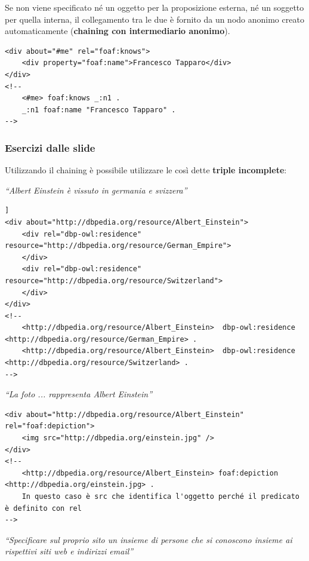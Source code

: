 Se non viene specificato né un oggetto per la proposizione esterna, né un soggetto per quella interna, il collegamento tra le due è fornito da un nodo anonimo creato automaticamente (\textbf{chaining con intermediario anonimo}).

\begin{lstlisting}[language=RDFA, caption=Utilizzo del chaining anonimo]
<div about="#me" rel="foaf:knows">
	<div property="foaf:name">Francesco Tapparo</div>
</div>
<!--
	<#me> foaf:knows _:n1 .
	_:n1 foaf:name "Francesco Tapparo" .
-->
\end{lstlisting}

\subsubsection{Esercizi dalle slide}

Utilizzando il chaining è possibile utilizzare le così dette \textbf{triple incomplete}:

\begin{center}
\textit{``Albert Einstein è vissuto in germania e svizzera''}
\end{center}

\begin{lstlisting}[language=RDFA]]
<div about="http://dbpedia.org/resource/Albert_Einstein">	
	<div rel="dbp-owl:residence" resource="http://dbpedia.org/resource/German_Empire">
	</div>
	<div rel="dbp-owl:residence" resource="http://dbpedia.org/resource/Switzerland">
	</div>
</div>
<!--
	<http://dbpedia.org/resource/Albert_Einstein>  dbp-owl:residence <http://dbpedia.org/resource/German_Empire> .
	<http://dbpedia.org/resource/Albert_Einstein>  dbp-owl:residence <http://dbpedia.org/resource/Switzerland> .
-->
\end{lstlisting}

\begin{center}
	\textit{``La foto ... rappresenta Albert Einstein''}
\end{center}

\begin{lstlisting}[language=RDFA]
<div about="http://dbpedia.org/resource/Albert_Einstein" rel="foaf:depiction">
	<img src="http://dbpedia.org/einstein.jpg" />
</div>
<!-- 
	<http://dbpedia.org/resource/Albert_Einstein> foaf:depiction <http://dbpedia.org/einstein.jpg> .
	In questo caso è src che identifica l'oggetto perché il predicato è definito con rel
-->
\end{lstlisting}

\begin{center}
	\textit{``Specificare sul proprio sito un insieme di persone che si conoscono insieme ai rispettivi siti web e indirizzi email''}
\end{center}

